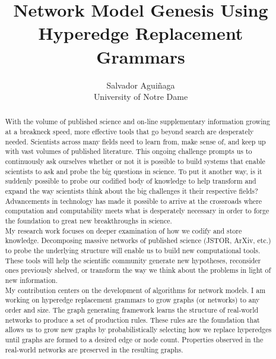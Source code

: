 \documentclass[letterpaper, 12pt, oneside]{memoir}
\title{Network Model Genesis Using Hyperedge Replacement Grammars}
\author{{Salvador Agui\~{n}aga}\\
        {University of Notre Dame}\\
        }
\begin{document}
\frontmatter

\let\oldcleartorecto\cleartorecto
\let\cleartorecto\relax
\maketitle
\pagestyle{empty}

\begin{abstract}
  With the volume of published science and on-line supplementary information growing
  at a breakneck speed, more effective tools that go beyond search are 
  desperately needed. Scientists across many fields need to learn from, make sense
  of, and keep up with vast volumes of published literature.
  This ongoing challenge prompts us to continuously ask ourselves whether
  or not it is possible to build systems that enable scientists to ask
  and probe the big questions in science. To put it another way,
  is it suddenly possible to probe our codified body of knowledge
  to help transform and expand the way scientists think about the big challenges
  it their respective fields?
  Advancements in technology has made it possible to arrive at
  the crossroads where computation and computability meets what is desperately
  necessary in order to forge the foundation to great new breakthroughs in science.\\
  

  My research work focuses on deeper examination of how we codify and store
  knowledge. Decomposing massive networks of published science (JSTOR, ArXiv, etc.)
  to probe the underlying structure will enable us to build new computational tools.
  These tools will help the scientific community generate new hypotheses, reconsider
  ones previously shelved, or transform the way we think about the problems
  in light of new information.\\

  My contribution centers on the development of algorithms for network models. I
  am working on hyperedge replacement grammars to grow graphs (or networks) to
  any order and size. The graph generating framework learns the structure of real-world networks to produce a set of production rules. These rules are the foundation that
  allows us to grow new graphs by probabilistically selecting how we replace
  hyperedges until graphs are formed to a desired edge or node count. Properties
  observed in the real-world networks are preserved in the resulting graphs.
  

\end{abstract}
\end{document}
